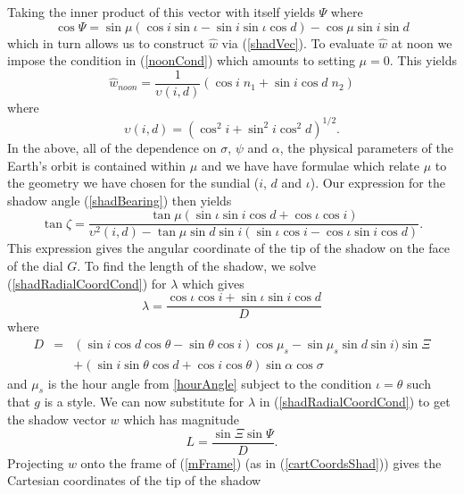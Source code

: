 \documentclass[12pt]{article}
\newcommand{\nn}{\nonumber}
\newcommand{\what}{\hat{w}}
\begin{document}
%
Taking the inner product of this vector with itself yields $\Psi$ where
%
\begin{equation}
\cos\Psi = \sin\mu (\cos i\sin\iota - \sin i\sin\iota\cos d) - \cos\mu \sin i\sin d
\end{equation}
%
which in turn allows us to construct $\what$ via (\ref{shadVec}). To evaluate $\what$ at noon we impose the condition in (\ref{noonCond}) which amounts to setting $\mu = 0$. This yields
%
\begin{equation}
\what_{noon} = \frac{1}{\upsilon(i,d)}(\cos i \; n_1 + \sin i\cos d\; n_2)
\end{equation}
%
where
%
\begin{equation}
\upsilon(i,d) = (\cos^2 i + \sin^2 i\cos^2 d)^{1/2}.
\end{equation}
%
In the above, all of the dependence on $\sigma$, $\psi$ and $\alpha$, the physical parameters of the Earth's orbit is contained within $\mu$ and we have have formulae which relate $\mu$ to the geometry we have chosen for the sundial ($i$, $d$ and $\iota$). Our expression for the shadow angle (\ref{shadBearing}) then yields
%
\begin{equation} \label{tanzeta}
\tan\zeta = \frac{\tan\mu(\sin\iota\sin i \cos d + \cos\iota\cos i)}
{\upsilon^2(i,d) - \tan\mu\sin d\sin i(\sin\iota\cos i - \cos\iota\sin i\cos d)}.
\end{equation}
%
This expression gives the angular coordinate of the tip of the shadow on the face of the dial $G$. To find the length of the shadow, we solve (\ref{shadRadialCoordCond}) for $\lambda$ which gives
%
\begin{equation}
\lambda = \frac{\cos\iota\cos i + \sin\iota\sin i \cos d}{D}
\end{equation}
%
where
%
\begin{eqnarray} \label{D}
D & = & (\sin i \cos d \cos\theta-\sin\theta\cos i)\cos\mu_s-\sin\mu_s \sin d\sin i)\sin\Xi \\ \nn
  &   & +(\sin i\sin\theta\cos d+\cos i\cos\theta)\sin\alpha\cos\sigma
\end{eqnarray}
%
and $\mu_s$ is the hour angle from \ref{hourAngle} subject to the condition $\iota = \theta$ such that $g$ is a style. We can now substitute for $\lambda$ in (\ref{shadRadialCoordCond}) to get the shadow vector $w$ which has magnitude
%
\begin{equation} \label{L}
L = \frac{\sin\Xi\sin\Psi}{D}.
\end{equation}
%
Projecting $w$ onto the frame of (\ref{mFrame}) (as in (\ref{cartCoordsShad})) gives the Cartesian coordinates of the tip of the shadow
\end{document}

